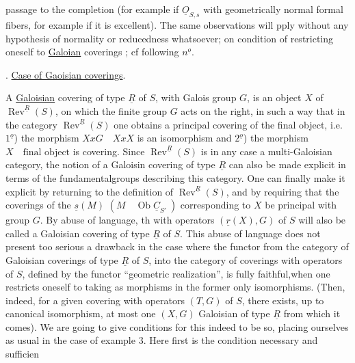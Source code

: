 
passage to the completion (for example if $\underline{O}_{S,s}$ with geometrically normal formal fibers, for example if it is excellent). The same observations will pply without any hypothesis of normality or reducedness whatsoever; on condition of restricting oneself to  \uline{Galoian} coverings ; cf following $n^{\underline{o}}$.

. \uline{Case of Gaoisian coverings}.

A \uline{Galoisian} covering of type $\underline{R}$ of $S$, with Galois group $G$, is an object $X$ of $\operatorname{Rev}^{\underline{R}}(S)$, on which the finite group $G$ acts on the right, in such a way that in the category $\operatorname{Rev}^{\underline{R}}(S)$ one obtains a principal covering of the final object, i.e. $1^{\underline{o}}$) the morphism $XxG\quad XxX$ is an isomorphism and $2^{\underline{o}}$) the morphism $X\quad\text{final object}$ is covering. Since $\operatorname{Rev}^{\underline{R}}(S)$ is in any case a multi-Galoisian category, the notion of a Galoisin covering of type $\underline{R}$ can also be made explicit in terms of the fundamentalgroups describing this category. One can finally make it explicit by returning to the definition of $\operatorname{Rev}^{\underline{R}}(S)$, and by requiring that the coverings of the $\underline{s}(M)$ $(M\quad\operatorname{Ob}\underline{C}_{S'}\ )$ corresponding to $X$ be principal with group $G$. By abuse of language, th  with operators $(\underline{r}(X),G)$ of $S$ will also be called a Galoisian covering of type $\underline{R}$ of $S$. This abuse of language does not present too serious a drawback in the case where the functor from the category of Galoisian coverings of type $\underline{R}$ of $S$, into the category of coverings with operators of $S$, defined by the functor ``geometric realization'', is fully faithful,when one restricts oneself to taking as morphisms in the former only isomorphisms. (Then, indeed, for a given covering with operators $(T,G)$ of $S$, there exists, up to canonical isomorphism, at most one $(X,G)$  Galoisian of type $\underline{R}$ from which it comes). We are going to give conditions for this indeed to be so, placing ourselves as usual in the case of example 3. Here first is the condition necessary and sufficien
